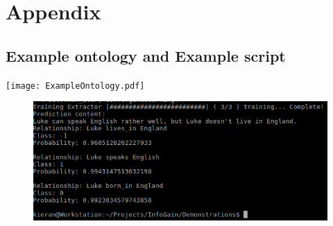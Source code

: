 \documentclass[12pt]{article} %
\begin{document}


\newpage
\section{Appendix}

\subsection{Example ontology and Example script} \label{examplescript}


\texttt{[image: ExampleOntology.pdf]}



\begin{figure}
\centering
\includegraphics[scale=0.8]{Example.png}
\end{figure}
\end{document}
